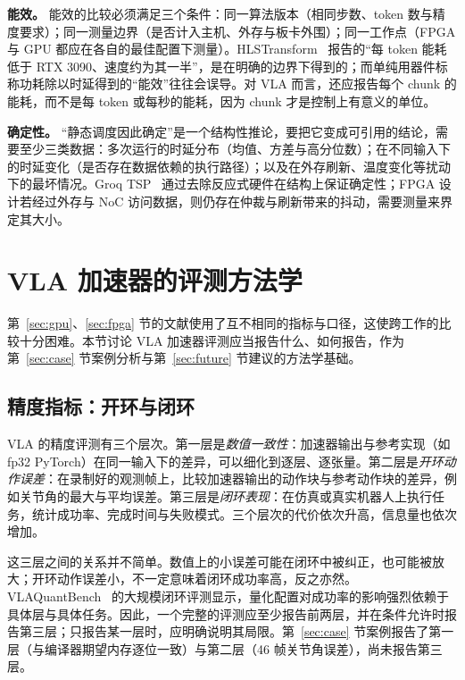 \documentclass[a4paper,10.5pt]{ctexart}
\begin{document}
\textbf{能效。} 能效的比较必须满足三个条件：同一算法版本（相同步数、token 数与精度要求）；同一测量边界（是否计入主机、外存与板卡外围）；同一工作点（FPGA 与 GPU 都应在各自的最佳配置下测量）。HLSTransform~\cite{hlstransform} 报告的“每 token 能耗低于 RTX 3090、速度约为其一半”，是在明确的边界下得到的；而单纯用器件标称功耗除以时延得到的“能效”往往会误导。对 VLA 而言，还应报告每个 chunk 的能耗，而不是每 token 或每秒的能耗，因为 chunk 才是控制上有意义的单位。

\textbf{确定性。} “静态调度因此确定”是一个结构性推论，要把它变成可引用的结论，需要至少三类数据：多次运行的时延分布（均值、方差与高分位数）；在不同输入下的时延变化（是否存在数据依赖的执行路径）；以及在外存刷新、温度变化等扰动下的最坏情况。Groq TSP~\cite{groq} 通过去除反应式硬件在结构上保证确定性；FPGA 设计若经过外存与 NoC 访问数据，则仍存在仲裁与刷新带来的抖动，需要测量来界定其大小。

\section{VLA 加速器的评测方法学}\label{sec:eval}

第~\ref{sec:gpu}、\ref{sec:fpga} 节的文献使用了互不相同的指标与口径，这使跨工作的比较十分困难。本节讨论 VLA 加速器评测应当报告什么、如何报告，作为第~\ref{sec:case} 节案例分析与第~\ref{sec:future} 节建议的方法学基础。

\subsection{精度指标：开环与闭环}

VLA 的精度评测有三个层次。第一层是\emph{数值一致性}：加速器输出与参考实现（如 fp32 PyTorch）在同一输入下的差异，可以细化到逐层、逐张量。第二层是\emph{开环动作误差}：在录制好的观测帧上，比较加速器输出的动作块与参考动作块的差异，例如关节角的最大与平均误差。第三层是\emph{闭环表现}：在仿真或真实机器人上执行任务，统计成功率、完成时间与失败模式。三个层次的代价依次升高，信息量也依次增加。

这三层之间的关系并不简单。数值上的小误差可能在闭环中被纠正，也可能被放大；开环动作误差小，不一定意味着闭环成功率高，反之亦然。VLAQuantBench~\cite{vlaquantbench} 的大规模闭环评测显示，量化配置对成功率的影响强烈依赖于具体层与具体任务。因此，一个完整的评测应至少报告前两层，并在条件允许时报告第三层；只报告某一层时，应明确说明其局限。第~\ref{sec:case} 节案例报告了第一层（与编译器期望内存逐位一致）与第二层（46 帧关节角误差），尚未报告第三层。
\end{document}

